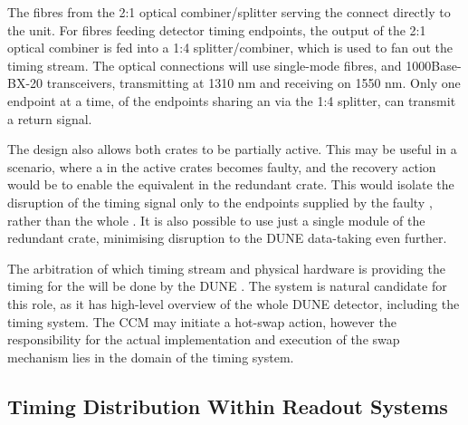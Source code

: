 \documentclass{dune}
\begin{document}
The fibres from the 2:1 optical combiner/splitter serving the  connect directly to the unit. For fibres feeding detector timing endpoints, the output of the 2:1 optical combiner is fed into a 1:4 splitter/combiner, which is used to fan out the  timing stream. The optical connections will use single-mode fibres, and 1000Base-BX-20  transceivers, transmitting at 1310 nm and receiving on 1550 nm. Only one endpoint at a time, of the endpoints sharing an  via the 1:4 splitter, can transmit a return signal.

The design also allows both crates to be partially active. This may be useful in a scenario, where a  in the active crates becomes faulty, and the recovery action would be to enable the equivalent  in the redundant crate. This would isolate the disruption of the timing signal only to the endpoints supplied by the faulty , rather than the whole . It is also possible to use just a single  module of the redundant crate, minimising disruption to the DUNE data-taking even further.

The arbitration of which  timing stream and physical hardware is providing the timing for the  will be done by the DUNE . The  system is natural candidate for this role, as it has high-level overview of the whole DUNE detector, including the timing system. The CCM may initiate a hot-swap action, however the responsibility for the actual implementation and execution of the swap mechanism lies in the domain of the timing system.


\subsection{Timing Distribution Within Readout Systems}
\end{document}
